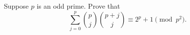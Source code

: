 Suppose $p$ is an odd prime. Prove that
\[
\sum_{j=0}^p \binom{p}{j} \binom{p+j}{j} \equiv 2^p + 1\pmod{p^2}.
\]
